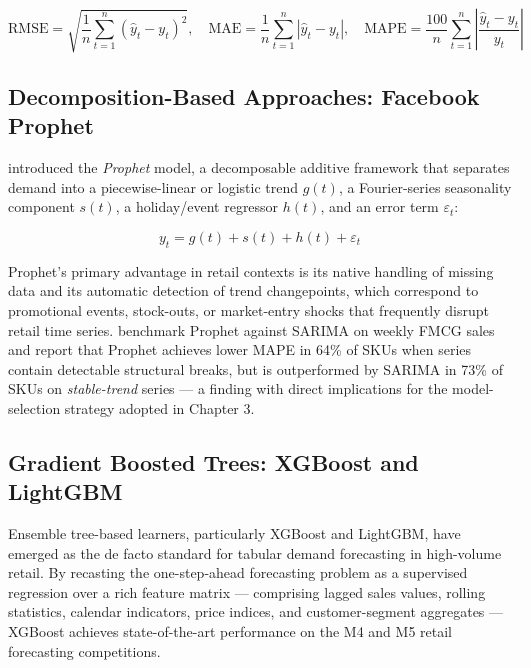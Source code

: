 \begin{equation}
    \text{RMSE} = \sqrt{\frac{1}{n}\sum_{t=1}^n (\hat{y}_t - y_t)^2}, \quad
    \text{MAE} = \frac{1}{n}\sum_{t=1}^n |\hat{y}_t - y_t|, \quad
    \text{MAPE} = \frac{100}{n}\sum_{t=1}^n \left|\frac{\hat{y}_t - y_t}{y_t}\right|
    \label{eq:error_metrics}
\end{equation}

\subsection{Decomposition-Based Approaches: Facebook Prophet}

\cite{TaylorLetham2018} introduced the \textit{Prophet} model, a decomposable additive framework that separates demand into a piecewise-linear or logistic trend $g(t)$, a Fourier-series seasonality component $s(t)$, a holiday/event regressor $h(t)$, and an error term $\varepsilon_t$:

\begin{equation}
    y_t = g(t) + s(t) + h(t) + \varepsilon_t
    \label{eq:prophet}
\end{equation}

Prophet's primary advantage in retail contexts is its native handling of missing data and its automatic detection of trend changepoints, which correspond to promotional events, stock-outs, or market-entry shocks that frequently disrupt retail time series. \cite{zb51_07} benchmark Prophet against SARIMA on weekly FMCG sales and report that Prophet achieves lower MAPE in 64\% of SKUs when series contain detectable structural breaks, but is outperformed by SARIMA in 73\% of SKUs on \textit{stable-trend} series — a finding with direct implications for the model-selection strategy adopted in Chapter 3.

\subsection{Gradient Boosted Trees: XGBoost and LightGBM}

Ensemble tree-based learners, particularly XGBoost \cite{ChenGuestrin2016} and LightGBM, have emerged as the de facto standard for tabular demand forecasting in high-volume retail. By recasting the one-step-ahead forecasting problem as a supervised regression over a rich feature matrix — comprising lagged sales values, rolling statistics, calendar indicators, price indices, and customer-segment aggregates — XGBoost achieves state-of-the-art performance on the M4 and M5 retail forecasting competitions.

